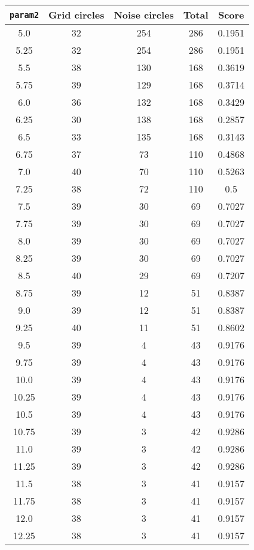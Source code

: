 \documentclass[letterpaper, 12pt]{article}
\begin{document}
\begin{longtable}{|c|c|c|c|c|}
\hline
\textbf{\texttt{param2}} & \textbf{Grid circles} & \textbf{Noise circles} & \textbf{Total} & \textbf{Score} \\
\hline
5.0 & 32 & 254 & 286 & 0.1951 \\
\hline
5.25 & 32 & 254 & 286 & 0.1951 \\
\hline
5.5 & 38 & 130 & 168 & 0.3619 \\
\hline
5.75 & 39 & 129 & 168 & 0.3714 \\
\hline
6.0 & 36 & 132 & 168 & 0.3429 \\
\hline
6.25 & 30 & 138 & 168 & 0.2857 \\
\hline
6.5 & 33 & 135 & 168 & 0.3143 \\
\hline
6.75 & 37 & 73 & 110 & 0.4868 \\
\hline
7.0 & 40 & 70 & 110 & 0.5263 \\
\hline
7.25 & 38 & 72 & 110 & 0.5 \\
\hline
7.5 & 39 & 30 & 69 & 0.7027 \\
\hline
7.75 & 39 & 30 & 69 & 0.7027 \\
\hline
8.0 & 39 & 30 & 69 & 0.7027 \\
\hline
8.25 & 39 & 30 & 69 & 0.7027 \\
\hline
8.5 & 40 & 29 & 69 & 0.7207 \\
\hline
8.75 & 39 & 12 & 51 & 0.8387 \\
\hline
9.0 & 39 & 12 & 51 & 0.8387 \\
\hline
9.25 & 40 & 11 & 51 & 0.8602 \\
\hline
9.5 & 39 & 4 & 43 & 0.9176 \\
\hline
9.75 & 39 & 4 & 43 & 0.9176 \\
\hline
10.0 & 39 & 4 & 43 & 0.9176 \\
\hline
10.25 & 39 & 4 & 43 & 0.9176 \\
\hline
10.5 & 39 & 4 & 43 & 0.9176 \\
\hline
10.75 & 39 & 3 & 42 & 0.9286 \\
\hline
11.0 & 39 & 3 & 42 & 0.9286 \\
\hline
11.25 & 39 & 3 & 42 & 0.9286 \\
\hline
11.5 & 38 & 3 & 41 & 0.9157 \\
\hline
11.75 & 38 & 3 & 41 & 0.9157 \\
\hline
12.0 & 38 & 3 & 41 & 0.9157 \\
\hline
12.25 & 38 & 3 & 41 & 0.9157 \\
\hline

\end{longtable}
\end{document}
